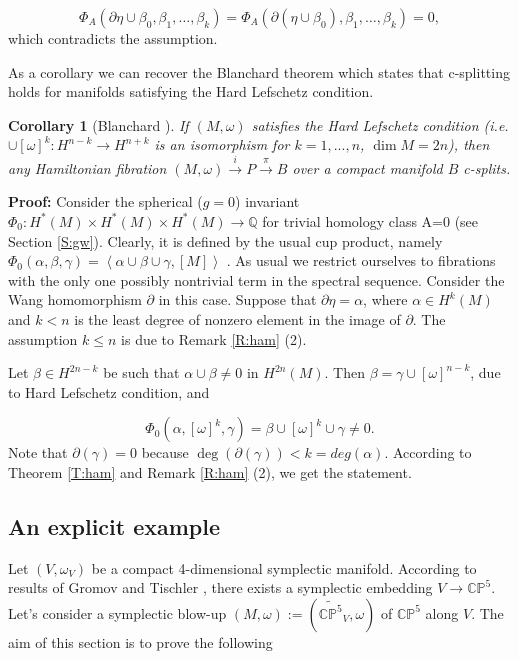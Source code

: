 \documentclass[a4paper,14pt]{article}
\newcommand{\B}[1]{\mathbb #1}
\newcommand{\al}{{\alpha}}
\newcommand{\be}{{\beta}}
\newcommand{\om}{{\omega}}
\newcommand{\ga}{{\gamma}}
\newcommand{\del}{\partial}
\newcommand{\qed}{\rightline {$\Box $}}
\newcommand{\map}[1]{\stackrel {#1}\longrightarrow}
\newcommand{\Mo}{(M,\omega )}
\newcommand{\cp}{{\B C\B P}}
\newcommand{\sfib}{\Mo \map{i} P\map{\pi } B}
\newcommand{\pf}{\NI {\bf Proof: }}
\newcommand{\BS}{{\bigskip}}
\newcommand{\NI}{{\noindent}}
\newtheorem{cor}[theorem]{Corollary}
\numberwithin{equation}{section}
\begin{document}
$$\Phi _A (\partial \eta \cup \be _0,\be _1,\dots ,\be _k)=
\Phi _A (\partial (\eta \cup \be_0),\be_1,\dots ,\be_k)=0,$$
which contradicts the assumption.

\qed


\BS
As a corollary we can recover the Blanchard theorem which
states that c-splitting holds for manifolds satisfying the
Hard Lefschetz condition.

\begin{cor}[Blanchard \cite{bl}]\label{C:blanchard}
If $\Mo $ satisfies the Hard Lefschetz condition (i.e.
$\cup [\om ]^k :H^{n-k}\to H^{n+k}$ is an isomorphism for
$k=1,...,n$, $\dim M=2n$), then any Hamiltonian fibration
$\sfib $ over a compact manifold $B$ c-splits.
\end{cor}


\pf
Consider the spherical ($g=0$) invariant 
$\Phi _0: H^*(M)\times H^*(M)\times H^*(M)\to \B Q$
for trivial homology class A=0 (see Section \ref{S:gw}). 
Clearly, it is
defined by the usual cup product, namely
$\Phi _0(\al, \be, \ga ) = \left <\al \cup \be \cup \ga ,[M]\right >$
\cite {ms2}.
As usual we restrict ourselves to  fibrations 
with the only one possibly nontrivial term in the spectral
sequence. 
Consider the Wang homomorphism $\del $ in this case. 
Suppose that $\del \eta = \al $, where $\al \in H^k(M)$ and $k< n$
is the least degree of nonzero element in the image of $\del $.
The assumption $k\leq n$ is due to Remark \ref{R:ham} (2).

Let $\be \in H^{2n-k}$ be such that
$\al \cup \be  \neq 0$ in $H^{2n}(M)$.
Then 
$\be = \ga \cup [\om ]^{n-k}$, due to Hard Lefschetz condition, and

$$\Phi _0(\al , [\om ]^k, \ga) =
\be \cup [\om ]^k \cup \ga \neq 0.
$$
Note that $\del (\ga )=0$ because $\deg (\del (\ga )) < k=deg (\al )$.
According to Theorem \ref{T:ham} and 
Remark \ref{R:ham} (2), 
we get the statement.

\qed

\BS


\subsection{An explicit example}\label{SS:ex}

Let $(V, \om _V)$ be a compact 4-dimensional symplectic manifold.
According to results of Gromov \cite{pdr} and
Tischler \cite{ti}, there exists a symplectic
embedding $V\to \cp ^5$. Let's consider a symplectic blow-up
$\Mo :=(\widetilde {\cp ^5}_V,\om )$ of $\cp ^5$ along $V$.
The aim of this section is to prove the following
\end{document}
